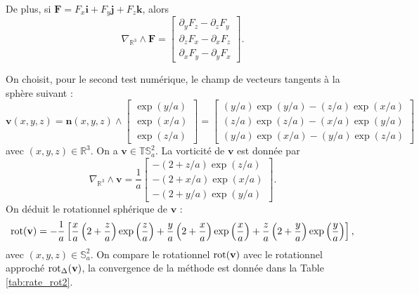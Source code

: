 De plus, si $\mathbf{F} = F_x \mathbf{i} + F_y \mathbf{j} + F_z  \mathbf{k}$, alors
\begin{equation}
\nabla_{\mathbb{R}^3} \wedge \mathbf{F} =
\begin{bmatrix}
\partial_y F_z - \partial_z F_y \\
\partial_z F_x - \partial_x F_z \\
\partial_x F_y - \partial_y F_x
\end{bmatrix} .
\end{equation}

On choisit, pour le second test numérique, le champ de vecteurs tangents à la sphère suivant :
\begin{equation}
\mathbf{v}(x,y,z) = \mathbf{n}(x,y,z) \wedge \begin{bmatrix}
\exp (y/a) \\ \exp (x/a) \\ \exp (z/a)
\end{bmatrix} =
\begin{bmatrix}
(y/a) \exp (y/a) - (z/a) \exp (x/a)\\
(z/a) \exp (z/a) - (x/a) \exp (y/a)\\
(y/a) \exp (x/a) - (y/a) \exp (z/a)
\end{bmatrix} 
\label{eq:fun1_rot}
\end{equation}
avec $(x,y,z) \in \mathbb{R}^3$. On a $\mathbf{v} \in \mathbb{T}\mathbb{S}_a^2$.
La vorticité de $\mathbf{v}$ est donnée par
\begin{equation}
\nabla_{\mathbb{R}^3} \wedge \mathbf{v} = \dfrac{1}{a} \begin{bmatrix}
-(2+z/a) \exp (z/a)\\ -(2+x/a) \exp (x/a)\\ -(2+y/a) \exp (y/a)
\end{bmatrix}.
\end{equation}
On déduit le rotationnel sphérique de $\mathbf{v}$ :
\begin{equation}
\text{rot} ( \mathbf{v} ) = - \dfrac{1}{a} \left[ \dfrac{x}{a} \left( 2 + \dfrac{z}{a}  \right) \exp \left( \dfrac{z}{a} \right) + \dfrac{y}{a} \left( 2 + \dfrac{x}{a}  \right) \exp \left( \dfrac{x}{a} \right) + \dfrac{z}{a} \left( 2 + \dfrac{y}{a}  \right) \exp \left( \dfrac{y}{a} \right) \right],
\end{equation}
avec $(x,y,z) \in \mathbb{S}_a^2$. On compare le rotationnel $\text{rot} ( \mathbf{v} )$ avec le rotationnel approché $\text{rot}_{\Delta} ( \mathbf{v} )$, la convergence de la méthode est donnée dans la Table \ref{tab:rate_rot2}.

